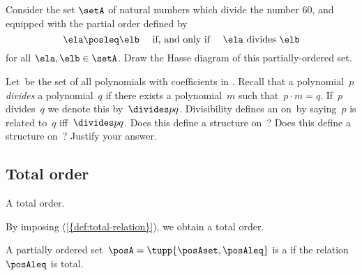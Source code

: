 \begin{gradedexercise}
Consider the set $\setA$ of natural numbers which divide the number 60, and equipped with the partial order defined by 
\begin{equation}
\ela \posleq \elb \quad \text{ if, and only if } \quad \ela \text{ divides } \elb
\end{equation}
for all $\ela, \elb \in \setA$. Draw the Hasse diagram of this partially-ordered set. 
\end{gradedexercise}

\begin{gradedexercise}
    \label{ex:PolynomialDivisibility}
    Let~\setA be the set of all polynomials with coefficients in \reals.
    Recall that a polynomial~$p$ \emph{divides} a polynomial~$q$ if there exists a polynomial~$m$ such that~$p \cdot m = q$.
    If~$p$ divides~$q$ we denote this by~$\divides p q$.
    Divisibility defines an  on~\setA by saying~$p$ is related to~$q$ iff~$\divides p q$.
    Does this define a  structure on~\setA?
    Does this define a  structure on~\setA?
    Justify your answer.
\end{gradedexercise}




\vfill

\subsection{Total order}



\begin{marginfigure}
    \centering
    \caption{A total order.}
    \label{fig:tot_order_graph}
\end{marginfigure}
By imposing \emph{} (\cref{{def:total-relation}}), we obtain a total order.

\begin{ctdefinition}
    \label{def:total-order}
    A partially ordered set~$\posA = \tupp{\posAset,\posAleq}$ is a  if the relation~$\posAleq$ is total.
\end{ctdefinition}

